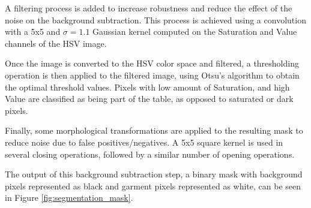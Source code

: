 A filtering process is added to increase robustness and reduce the effect of the noise on the background subtraction. This process is achieved using a convolution with a 5x5 and $\sigma=1.1$ Gaussian kernel computed on the Saturation and Value channels of the HSV image.

Once the image is converted to the HSV color space and filtered, a thresholding operation is then applied to the filtered image, using Otsu's algorithm  to obtain the optimal threshold values. Pixels with low amount of Saturation, and high Value are classified as being part of the table, as opposed to saturated or dark pixels.

Finally, some morphological transformations are applied to the resulting mask to reduce noise due to false positives/negatives. A 5x5 square kernel is used in several closing operations, followed by a similar number of opening operations. 

The output of this background subtraction step, a binary mask with background pixels represented as black and garment pixels represented as white, can be seen in Figure \ref{fig:segmentation_mask}.


